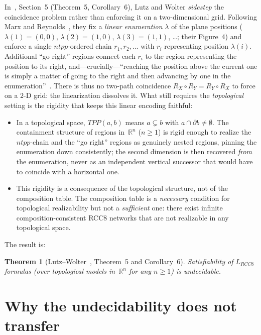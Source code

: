 \documentclass[11pt]{article}
\newtheorem{theorem}{Theorem}
\newcommand{\LRCC}[1]{\ensuremath{L_{\mathit{RCC#1}}}}
\newcommand{\reals}{\mathbb{R}}
\begin{document}
In~\cite{LutzWolter2006}, Section~5 (Theorem~5, Corollary~6), Lutz and Wolter
\emph{sidestep} the coincidence problem rather than enforcing it on a
two-dimensional grid.  Following Marx and Reynolds~\cite{MarxReynolds1999},
they fix a \emph{linear enumeration} $\lambda$ of the plane positions
($\lambda(1)=(0,0)$, $\lambda(2)=(1,0)$, $\lambda(3)=(1,1)$, \ldots; their
Figure~4) and enforce a single $ntpp$-ordered chain $r_1, r_2, \ldots$ with
$r_i$ representing position $\lambda(i)$.  Additional ``go right'' regions
connect each $r_i$ to the region representing the position to its right,
and---crucially---``reaching the position above the current one is simply a
matter of going to the right and then advancing by one in the
enumeration''~\cite{LutzWolter2006}.  There is thus no two-path coincidence
$R_X \circ R_Y = R_Y \circ R_X$ to force on a $2$-D grid: the linearization
dissolves it.  What still requires the \emph{topological} setting is the
rigidity that keeps this linear encoding faithful:
\begin{itemize}
  \item In a topological space, $TPP(a,b)$ means $a \subsetneq b$ with
    $a \cap \partial b \neq \emptyset$.  The containment structure of regions
    in~$\reals^n$ ($n \geq 1$) is rigid enough to realize the $ntpp$-chain and
    the ``go right'' regions as genuinely nested regions, pinning the
    enumeration down consistently; the second dimension is then recovered
    \emph{from} the enumeration, never as an independent vertical successor
    that would have to coincide with a horizontal one.
  \item This rigidity is a consequence of the topological structure, not of the
    composition table.  The composition table is a \emph{necessary} condition
    for topological realizability but not a \emph{sufficient} one: there exist
    infinite composition-consistent RCC8 networks that are not realizable in
    any topological space.
\end{itemize}

The result is:

\begin{theorem}[Lutz--Wolter~\cite{LutzWolter2006}, Theorem~5 and Corollary~6]
  Satisfiability of $\LRCC{8}$ formulas (over topological models in~$\reals^n$
  for any $n \geq 1$) is undecidable.
\end{theorem}

\section{Why the undecidability does not transfer}
\label{sec:nontransfer}
\end{document}
